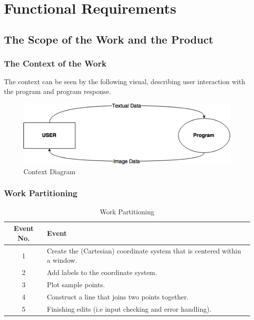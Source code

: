 \documentclass[12pt, titlepage]{article}
\begin{document}
\section{Functional Requirements}

\subsection{The Scope of the Work and the Product}

\subsubsection{The Context of the Work}
The context can be seen by the following visual, describing user interaction with the program and program response. \\
		
	\begin{figure}[!htb]
		\includegraphics[scale=0.8]{img/ContextDiagram.png}
		\caption{Context Diagram}
	\end{figure}
	
\subsubsection{Work Partitioning}

\begin{center}
\begin{table}[!hpb]
    \caption{Work Partitioning} 
    \begin{tabular}{ |c|p{11cm}|}
	\hline
	Event No. & Event\\ \hline
	1 & Create the (Cartesian) coordinate system that is centered within a window.\\ \hline
	2 & Add labels to the coordinate system. \\ \hline
	3 & Plot sample points.\\ \hline
	4 & Construct a line that joins two points together.\\ \hline
	5 & Finishing edits (i.e input checking and error handling).\\ \hline
    \end{tabular}

\end{table}
\end{center}
\end{document}
